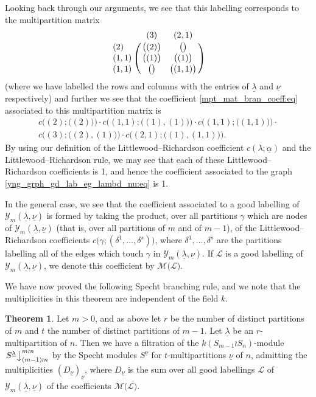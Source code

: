 \documentclass[10pt]{article}
\theoremstyle{definition}
\newtheorem{theo}[theorem]{Theorem}
\newcommand{\ul}[1]{\underline{#1}}
\begin{document}
Looking back through our arguments, we see that this labelling corresponds to the multipartition matrix
\[
\bordermatrix{
      & (3)             &(2,1)              \cr
(2)   & \bigl((2)\bigr) & \bigl(\bigr)      \cr
(1,1) & \bigl((1)\bigr) & \bigl((1)\bigr)   \cr
(1,1) & \bigl(\bigr)    & \bigl((1,1)\bigr)
}
\]
(where we have labelled the rows and columns with the entries of $\ul{\lambda}$ and $\ul{\nu}$ respectively)
and further we see that the coefficient \eqref{mpt_mat_bran_coeff:eq} associated to this multipartition matrix is
\begin{multline*}
c\bigl((2);\bigl((2)\bigr)\bigr)\cdot c\bigl((1,1);\bigl((1),(1)\bigr)\bigr)\cdot c\bigl((1,1);\bigl((1,1)\bigr)\bigr)\cdot\\
c\bigl((3);\bigl((2),(1)\bigr)\bigr)\cdot c\bigl((2,1);\bigl((1),(1,1)\bigr)\bigr).
\end{multline*}
By using our definition of the Littlewood--Richardson coefficient $c(\lambda;\ul{\alpha})$ and the Littlewood--Richardson rule, we may see
that each of these Littlewood--Richardson coefficients is 1, and hence the coefficient
associated to the graph \eqref{yng_grph_gd_lab_eg_lambd_nu:eq} is 1.

In the general case, we see that the coefficient associated to a good labelling of $\mathcal{Y}_m(\ul{\lambda},\ul{\nu})$ is formed by
taking the product, over all partitions $\gamma$ which are nodes of $\mathcal{Y}_m(\ul{\lambda},\ul{\nu})$ (that is, over all partitions
of $m$ and of $m-1$), of the Littlewood--Richardson coefficients $c\bigl(\gamma;(\delta^1,\ldots,\delta^s)\bigr)$, where
$\delta^1,\ldots,\delta^s$ are the partitions
labelling all of the edges which touch $\gamma$ in $\mathcal{Y}_m(\ul{\lambda},\ul{\nu})$. If $\mathcal{L}$ is a good labelling of
$\mathcal{Y}_m(\ul{\lambda},\ul{\nu})$, we denote this coefficient by $\mathcal{M}\bigl(\mathcal{L}\bigr)$.

We have now proved the following Specht branching rule, and we note that the multiplicities in this theorem are independent of the field
$k$.

\begin{theo}\label{wr_branching_one:thm}
Let $m>0$, and as above let $r$ be the number of distinct partitions of $m$ and $t$ the number of distinct partitions of $m-1$.
Let $\ul{\lambda}$ be an $r$-multipartition of $n$. Then we have a filtration of the $k(S_{m-1} \wr S_n)$-module
$\left.S^{\ul{\lambda}}\right\downarrow^{m \wr n}_{(m-1) \wr n}$ by the Specht modules $S^{\ul{\nu}}$ for $t$-multipartitions $\ul{\nu}$ of $n$,
admitting the multiplicities $(D_{\ul{\nu}})_{\ul{\nu}}$,  where $D_{\ul{\nu}}$  is the sum over all good labellings $\mathcal{L}$ of
$\mathcal{Y}_m(\ul{\lambda},\ul{\nu})$ of the coefficients $\mathcal{M}\bigl(\mathcal{L}\bigr)$.
\end{theo}
\end{document}
